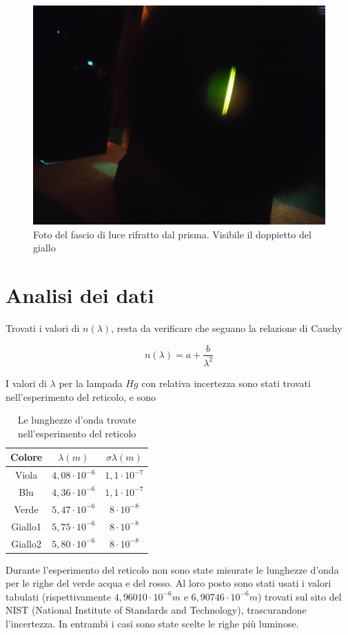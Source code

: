 \documentclass{article}
\begin{document}
\begin{figure}[h]
  \centering
  \includegraphics[width=0.7\linewidth]{FotoPrisma4}
  \caption{Foto del fascio di luce rifratto dal prisma. Visibile il doppietto del giallo}
\end{figure}

\section{Analisi dei dati}

Trovati i valori di $n (\lambda)$, resta da verificare che seguano la relazione di Cauchy

\[n(\lambda)=a+\frac{b}{\lambda ^2}\]

I valori di $\lambda$ per la lampada $Hg$ con relativa incertezza sono stati trovati nell'esperimento del reticolo, e sono 

\begin{table}[h!]
\centering
\begin{tabular}{ | c | c | c | }
  \hline
  Colore & $\lambda (m)$ & $\sigma \lambda (m)$ \\
  \hline
  Viola & $4,08 \cdot 10^{-6}$ & $1,1 \cdot 10^{-7}$ \\
  Blu & $4,36 \cdot 10^{-6}$ & $1,1 \cdot 10^{-7}$ \\
  Verde & $5,47 \cdot 10^{-6}$ & $8 \cdot 10^{-8}$ \\
  Giallo1 & $5,75 \cdot 10^{-6}$ & $8 \cdot 10^{-8}$ \\
  Giallo2 & $5,80 \cdot 10^{-6}$ & $8 \cdot 10^{-8}$ \\
  \hline
\end{tabular}
  \caption{Le lunghezze d'onda trovate nell'esperimento del reticolo}
  \label{table:1}
\end{table}

Durante l'esperimento del reticolo non sono state misurate le lunghezze d'onda per le righe del verde acqua e del rosso. Al loro posto sono stati usati i valori tabulati (rispettivamente $4,96010 \cdot 10^{-6} m$ e $6,90746 \cdot 10^{-6} m$) trovati sul sito del NIST (National Institute of Standards and Technology), trascurandone l'incertezza. In entrambi i casi sono state scelte le righe più luminose. 
\end{document}
